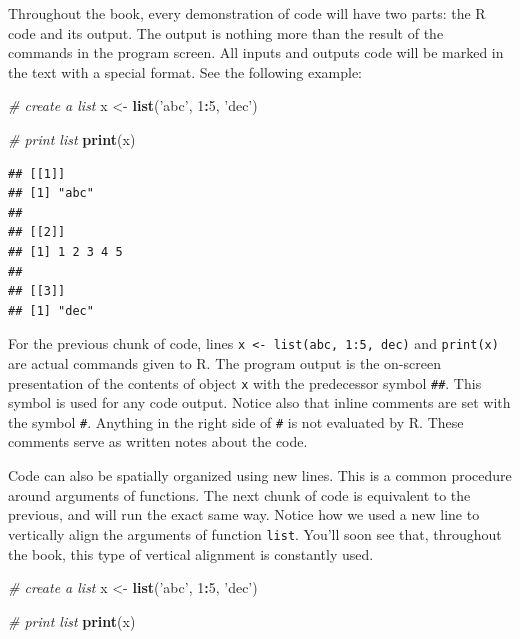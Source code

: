\documentclass[11pt,]{book}
\newenvironment{Shaded}{\begin{snugshade}}{\end{snugshade}}
\newcommand{\KeywordTok}[1]{\textcolor[rgb]{0.27,0.27,0.27}{\textbf{#1}}}
\newcommand{\DecValTok}[1]{\textcolor[rgb]{0.06,0.06,0.06}{#1}}
\newcommand{\StringTok}[1]{\textcolor[rgb]{0.5,0.5,0.5}{#1}}
\newcommand{\CommentTok}[1]{\textcolor[rgb]{0.56,0.35,0.01}{\textit{#1}}}
\newcommand{\OperatorTok}[1]{\textcolor[rgb]{0.81,0.36,0.00}{\textbf{#1}}}
\newcommand{\NormalTok}[1]{#1}
\begin{document}
Throughout the book, every demonstration of code will have two parts:
the R code and its output. The output is nothing more than the result of
the commands in the program screen. All inputs and outputs code will be
marked in the text with a special format. See the following example:

\begin{Shaded}
\begin{Highlighting}[]
\CommentTok{# create a list}
\NormalTok{x <-}\StringTok{ }\KeywordTok{list}\NormalTok{(}\StringTok{'abc'}\NormalTok{, }\DecValTok{1}\OperatorTok{:}\DecValTok{5}\NormalTok{, }\StringTok{'dec'}\NormalTok{)}

\CommentTok{# print list}
\KeywordTok{print}\NormalTok{(x)}
\end{Highlighting}
\end{Shaded}

\begin{verbatim}
## [[1]]
## [1] "abc"
## 
## [[2]]
## [1] 1 2 3 4 5
## 
## [[3]]
## [1] "dec"
\end{verbatim}

For the previous chunk of code, lines
\texttt{x\ \textless{}-\ list(\textquotesingle{}abc\textquotesingle{},\ 1:5,\ \textquotesingle{}dec\textquotesingle{})}
and \texttt{print(x)} are actual commands given to R. The program output
is the on-screen presentation of the contents of object \texttt{x} with
the predecessor symbol \texttt{\#\#}. This symbol is used for any code
output. Notice also that inline comments are set with the symbol
\texttt{\#}. Anything in the right side of \texttt{\#} is not evaluated
by R. These comments serve as written notes about the code.

Code can also be spatially organized using new lines. This is a common
procedure around arguments of functions. The next chunk of code is
equivalent to the previous, and will run the exact same way. Notice how
we used a new line to vertically align the arguments of function
\texttt{list}. You'll soon see that, throughout the book, this type of
vertical alignment is constantly used.

\begin{Shaded}
\begin{Highlighting}[]
\CommentTok{# create a list}
\NormalTok{x <-}\StringTok{ }\KeywordTok{list}\NormalTok{(}\StringTok{'abc'}\NormalTok{, }
          \DecValTok{1}\OperatorTok{:}\DecValTok{5}\NormalTok{, }
          \StringTok{'dec'}\NormalTok{)}

\CommentTok{# print list}
\KeywordTok{print}\NormalTok{(x)}
\end{Highlighting}
\end{Shaded}
\end{document}
